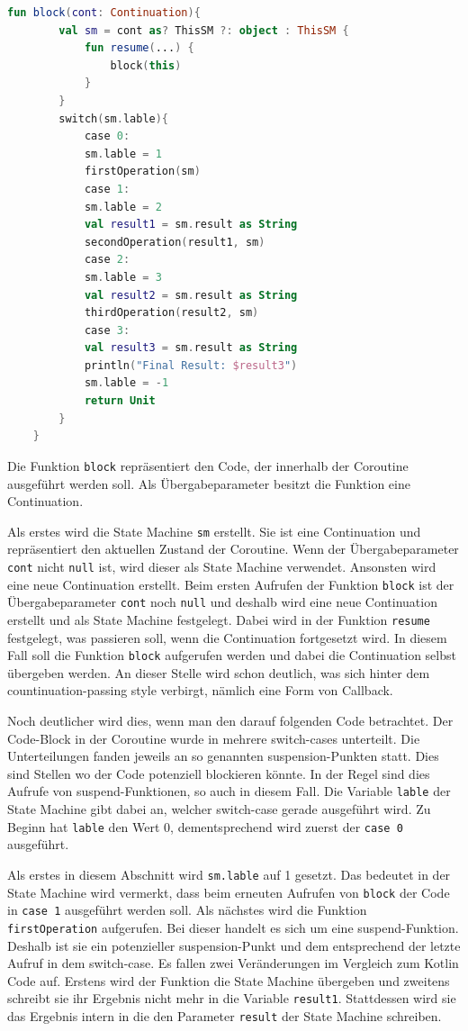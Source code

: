 \documentclass[fontsize=12pt,paper=a4,twoside=semi,parskip=half-,headsepline,headinclude]{scrreprt}
\begin{document}
\begin{lstlisting}[language=Kotlin]
	fun block(cont: Continuation){
		val sm = cont as? ThisSM ?: object : ThisSM {
			fun resume(...) {
				block(this)
			}
		}
		switch(sm.lable){
			case 0:
			sm.lable = 1
			firstOperation(sm)
			case 1:
			sm.lable = 2
			val result1 = sm.result as String
			secondOperation(result1, sm)
			case 2:
			sm.lable = 3
			val result2 = sm.result as String
			thirdOperation(result2, sm)
			case 3:
			val result3 = sm.result as String
			println("Final Result: $result3")
			sm.lable = -1
			return Unit
		}
	}
\end{lstlisting}

Die Funktion \texttt{block} repräsentiert den Code, der innerhalb der Coroutine ausgeführt werden soll. Als Übergabeparameter besitzt die Funktion eine Continuation. 

Als erstes wird die State Machine \texttt{sm} erstellt. Sie ist eine Continuation und repräsentiert den aktuellen Zustand der Coroutine\cite{Elizarov2021}. Wenn der Übergabeparameter \texttt{cont} nicht \texttt{null} ist, wird dieser als State Machine verwendet. Ansonsten wird eine neue Continuation erstellt. Beim ersten Aufrufen der Funktion \texttt{block} ist der Übergabeparameter \texttt{cont} noch \texttt{null} und deshalb wird eine neue Continuation erstellt und als State Machine festgelegt. Dabei wird in der Funktion \texttt{resume} festgelegt, was passieren soll, wenn die Continuation fortgesetzt wird. In diesem Fall soll die Funktion \texttt{block} aufgerufen werden und dabei die Continuation selbst übergeben werden. An dieser Stelle wird schon deutlich, was sich hinter dem countinuation-passing style verbirgt, nämlich eine Form von Callback. 

Noch deutlicher wird dies, wenn man den darauf folgenden Code betrachtet. Der Code-Block in der Coroutine wurde in mehrere switch-cases unterteilt. Die Unterteilungen fanden jeweils an so genannten suspension-Punkten statt. Dies sind Stellen wo der Code potenziell blockieren könnte. In der Regel sind dies Aufrufe von suspend-Funktionen, so auch in diesem Fall. Die Variable \texttt{lable} der State Machine gibt dabei an, welcher switch-case gerade ausgeführt wird. Zu Beginn hat \texttt{lable} den Wert 0, dementsprechend wird zuerst der \texttt{case 0} ausgeführt. 

Als erstes in diesem Abschnitt wird \texttt{sm.lable} auf 1 gesetzt. Das bedeutet in der State Machine wird vermerkt, dass beim erneuten Aufrufen von \texttt{block} der Code in \texttt{case 1} ausgeführt werden soll. Als nächstes wird die Funktion \texttt{firstOperation} aufgerufen. Bei dieser handelt es sich um eine suspend-Funktion. Deshalb ist sie ein potenzieller suspension-Punkt und dem entsprechend der letzte Aufruf in dem switch-case. Es fallen zwei Veränderungen im Vergleich zum Kotlin Code auf. Erstens wird der Funktion die State Machine übergeben und zweitens schreibt sie ihr Ergebnis nicht mehr in die Variable \texttt{result1}. Stattdessen wird sie das Ergebnis intern in die den Parameter \texttt{result} der State Machine schreiben. 
\end{document}
